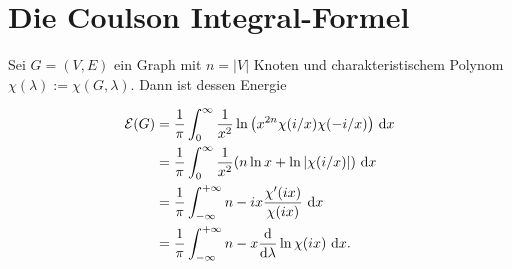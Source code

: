 
        \section{Die Coulson Integral-Formel}

        \begin{theorem}

            Sei $G = (V, E)$ ein Graph mit $n = |V|$ Knoten und charakteristischem Polynom $\chi(\lambda) := \chi(G, \lambda)$.
            Dann ist dessen Energie

            \begin{align}
                \mathcal E(G)
                & =
                \frac{1}{\pi}
                \int_0^\infty
                    \frac{1}{x^2}
                    \ln {\left ( x^{2 n} \chi(i/x) \chi(-i/x) \right )}
                    ~ \mathrm d x
                \label{eq:Coulson_1} \\
                & =
                \frac{1}{\pi}
                \int_0^\infty
                    \frac{1}{x^2}
                    {\left ( 
                        n \ln x
                        +
                        \ln |\chi(i/x)|
                     \right )}
                    ~ \mathrm d x
                \label{eq:Coulson_2} \\
                & =
                \frac{1}{\pi}
                \int_{-\infty}^{+\infty}
                    n - i x \frac{\chi^\prime(i x)}{\chi(i x)}
                    ~ \mathrm d x
                \label{eq:Coulson_3} \\
                & =
                \frac{1}{\pi}
                \int_{-\infty}^{+\infty}
                    n - x \frac{\mathrm d}{\mathrm d \lambda} \ln \chi(i x)
                    ~ \mathrm d x.
                \label{eq:Coulson_4}
            \end{align}

        \end{theorem}

